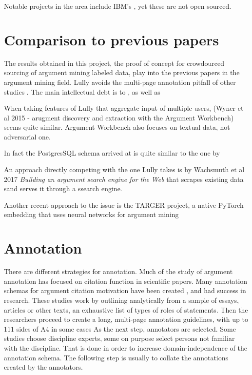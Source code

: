 \documentclass{report}
\begin{document}
{Notable projects in the area include IBM's \cite{slonim2021autonomous}, yet these are not open sourced.

\section{Comparison to previous papers}
The results obtained in this project, the proof of concept for crowdourced sourcing of argument mining labeled data, play into the previous papers in the argument mining field.
Lully avoids the multi-page annotation pitfall of other studies \cite{teufel_towards_2009}.
The main intellectual debt is to \cite{von_ahn_designing_2008}, as well as \cite{poesio_phrase_2013}

When taking features of Lully that aggregate input of multiple users, (Wyner et al 2015 - arugment discovery and extraction with the Argument Workbench) seems quite similar. Argument Workbench also focuses on textual data, not adversarial one. 

In fact the PostgresSQL schema arrived at is quite similar to the one by 
\cite{abbott_internet_2016}

An approach directly competing with the one Lully takes is by Wachsmuth et al 2017 \textit{Building an argument search engine for the Web} that scrapes existing data sand serves it through a ssearch engine.
\cite{wachsmuth_building_2017}

\cite{fromm_towards_2022}

Another recent approach to the issue is the TARGER project, a native PyTorch embedding that uses neural networks for argument mining

\cite{chernodub_targer_2019}

\section{Annotation}
There are different strategies for annotation. Much of the study of argument annotation has focused on citation function in scientific papers.
Many annotation schemas for argument citation motivation have been created \cite{teufel_scientific_2014}, \cite{mann_rhetorical_1987} and had success in research.
These studies work by outlining analytically from a sample of essays, articles or other texts, an exhaustive list of types of roles of statements.
Then the researchers proceed to create a long, multi-page annotation guidelines, with up to 111 sides of A4 in some cases \cite{teufel_towards_2009}
As the next step, annotators are selected. Some studies choose discipline experts, some on purpose select persons not familiar with the discipline.
That is done in order to increase domain-independence of the annotation schema.
The following step is usually to collate the annotations created by the annotators. 

}
\end{document}
